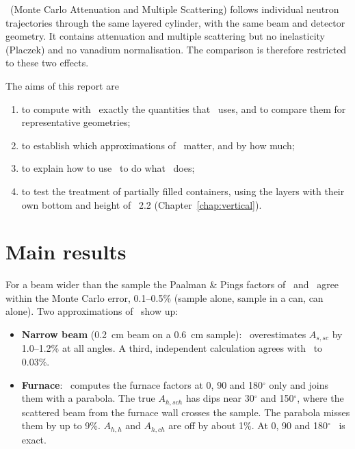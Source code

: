 \documentclass[11pt,a4paper]{report}
\begin{document}
\mcams\ (Monte Carlo Attenuation and Multiple Scattering) follows individual
neutron trajectories through the same layered cylinder, with the same beam and
detector geometry. It contains attenuation and multiple scattering but no
inelasticity (Placzek) and no vanadium normalisation. The comparison is therefore
restricted to these two effects.

The aims of this report are
\begin{enumerate}
  \item to compute with \mcams\ exactly the quantities that \pyc\ uses, and to
        compare them for representative geometries;
  \item to establish which approximations of \cor\ matter, and by how much;
  \item to explain how to use \mcams\ to do what \pyc\ does;
  \item to test the treatment of partially filled containers, using the layers
        with their own bottom and height of \mcams~2.2 (Chapter~\ref{chap:vertical}).
\end{enumerate}

\section*{Main results}

\begin{note}[Attenuation]
For a beam wider than the sample the Paalman \& Pings factors of \pyc\ and
\mcams\ agree within the Monte Carlo error, 0.1--0.5\% (sample alone, sample in
a can, can alone). Two approximations of \cor\ show up:
\begin{itemize}
  \item \textbf{Narrow beam} (0.2~cm beam on a 0.6~cm sample): \pyc\ overestimates
        $A_{s,sc}$ by 1.0--1.2\% at all angles. A third, independent calculation
        agrees with \mcams\ to 0.03\%.
  \item \textbf{Furnace}: \cor\ computes the furnace factors at 0, 90 and
        180$^\circ$ only and joins them with a parabola. The true $A_{h,sch}$ has
        dips near 30$^\circ$ and 150$^\circ$, where the scattered beam from the
        furnace wall crosses the sample. The parabola misses them by up to 9\%.
        $A_{h,h}$ and $A_{h,ch}$ are off by about 1\%. At 0, 90 and 180$^\circ$
        \pyc\ is exact.
\end{itemize}
\end{note}
\end{document}
